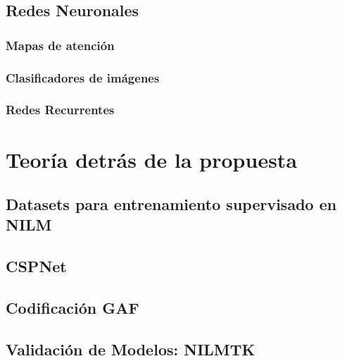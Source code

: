 \subsection{Redes Neuronales}
\subsubsection{Mapas de atención}
\subsubsection{Clasificadores de imágenes}
\subsubsection{Redes Recurrentes}


\section{Teoría detrás de la propuesta}
\subsection{Datasets para entrenamiento supervisado en NILM}
\subsection{CSPNet}     
\subsection{Codificación GAF} 
\subsection{Validación de Modelos: NILMTK}  

